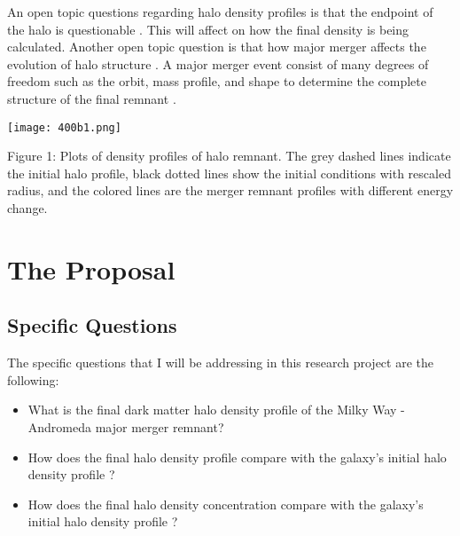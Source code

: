 \documentclass{article}
\begin{document}
An open topic questions regarding halo density profiles is that the endpoint of the halo is questionable \citep{d13}. This will affect on how the final density is being calculated. Another open topic question is that how major merger affects the evolution of halo structure \citep{d19a}. A major merger event consist of many degrees of freedom such as the orbit, mass profile, and shape to determine the complete structure of the final remnant \citep{d19a}.
\begin{center}
\texttt{[image: 400b1.png]} \par
Figure 1: Plots of density profiles of halo remnant. The grey dashed lines indicate the initial halo profile, black dotted lines show the initial conditions with rescaled radius, and the colored lines are the merger remnant profiles with different energy change.
\end{center}

\section{The Proposal}
\subsection{Specific Questions}
The specific questions that I will be addressing in this research project are the following: \par 
\begin{itemize}
    \item What is the final dark matter halo density profile of the Milky Way - Andromeda major merger remnant?
    \item How does the final halo density profile compare with the galaxy's initial halo density profile ?
    \item How does the final halo density concentration compare with the galaxy's initial halo density profile ?
\end{itemize}
\end{document}
